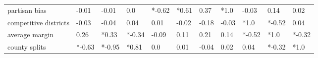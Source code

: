 \begin{tabular}{lllllllllll}
partisan bias         &   -0.01 &                       -0.01 &                     0.0 &                  *-0.62 &                        *0.61 &                      0.37 &                        *1.0 &                               -0.03 &                         0.14 &                        0.02 \\
competitive districts &   -0.03 &                       -0.04 &                    0.04 &                    0.01 &                        -0.02 &                     -0.18 &                       -0.03 &                                *1.0 &                       *-0.52 &                        0.04 \\
average margin        &    0.26 &                       *0.33 &                  *-0.34 &                   -0.09 &                         0.11 &                      0.21 &                        0.14 &                              *-0.52 &                         *1.0 &                      *-0.32 \\
county splits         &  *-0.63 &                      *-0.95 &                   *0.81 &                     0.0 &                         0.01 &                     -0.04 &                        0.02 &                                0.04 &                       *-0.32 &                        *1.0 \\
\bottomrule
\end{tabular}
